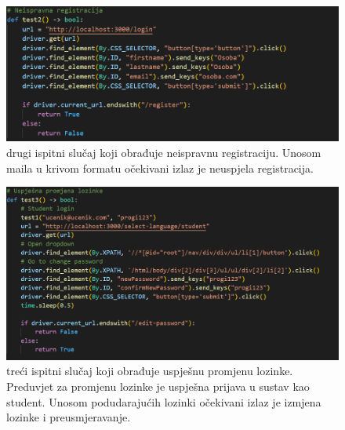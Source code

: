 \begin{figure}[htp]
    \includegraphics[scale=0.5]{dijagrami/test2.png}
    \centering
    \caption{drugi ispitni slučaj koji obrađuje neispravnu registraciju. Unosom maila u krivom formatu očekivani izlaz je neuspjela registracija.}
    
\end{figure}

\begin{figure}[htp]    
    \includegraphics[scale=0.5]{dijagrami/test3.png}
    \centering
    \caption{treći ispitni slučaj koji obrađuje uspješnu promjenu lozinke. Preduvjet za promjenu lozinke je uspješna prijava u sustav kao student. Unosom podudarajućih lozinki očekivani izlaz je izmjena lozinke i preusmjeravanje.}

\end{figure}

